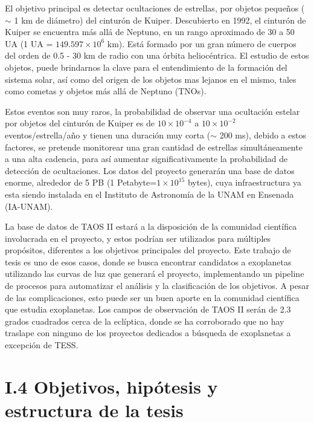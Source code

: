 El objetivo principal es detectar ocultaciones de estrellas, por objetos pequeños ($\sim$ 1 km de diámetro) del cinturón de Kuiper. Descubierto en 1992, el cinturón de Kuiper \citep{luu2002kuiper} se encuentra más allá de Neptuno, en un rango aproximado de 30 a 50 UA (1 UA = $ 149.597\times 10^{6}$ km). Está formado por un gran número de cuerpos del orden de 0.5 - 30 km de radio con una órbita heliocéntrica. El estudio de estos objetos, puede brindarnos la clave para el entendimiento de la formación del sistema solar, así como del origen de los objetos mas lejanos en el mismo, tales como cometas y objetos más allá de Neptuno (TNOs).

Estos eventos son muy raros, la probabilidad de observar una ocultación estelar por objetos del cinturón de Kuiper es de $10\times 10^{-4}$ a $10\times 10^{-2}$ eventos/estrella/año y tienen una duración muy corta ($\sim$ 200 ms), debido a estos factores, se pretende monitorear una gran cantidad de estrellas simultáneamente a una alta cadencia, para así aumentar significativamente la probabilidad de detección de ocultaciones. Los datos del proyecto generarán una base de datos enorme, alrededor de 5 PB (1 Petabyte=$ 1\times 10^{15}$ bytes), cuya infraestructura ya esta siendo instalada en el Instituto de Astronomía de la UNAM en Ensenada (IA-UNAM). 

La base de datos de TAOS II estará a la disposición de la comunidad científica involucrada en el proyecto, y estos podrían ser utilizados para múltiples propósitos, diferentes a los objetivos principales del proyecto. Este trabajo de tesis es uno de esos casos, donde se busca encontrar candidatos a exoplanetas utilizando las curvas de luz que generará el proyecto, implementando un pipeline de procesos para automatizar el análisis y la clasificación de los objetivos. A pesar de las complicaciones, esto puede ser un buen aporte en la comunidad científica que estudia exoplanetas. Los campos de observación de TAOS II serán de 2.3 grados cuadrados cerca de la eclíptica, donde se ha corroborado que no hay traslape con ninguno de los proyectos dedicados a búsqueda de exoplanetas a excepción de TESS.


\section*{I.4 Objetivos, hipótesis y estructura de la tesis}



